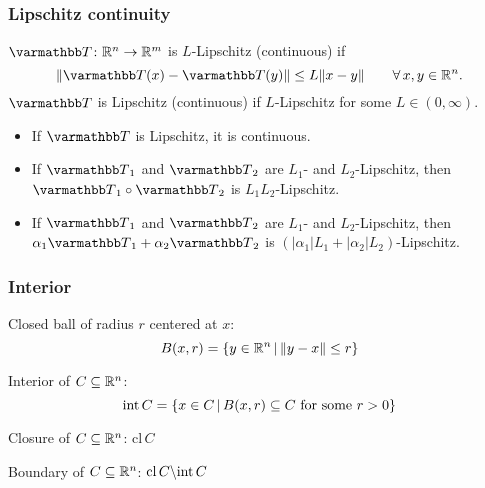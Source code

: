 \documentclass[10pt,mathserif]{beamer}
\begin{document}
\begin{frame}
\frametitle{Lipschitz continuity}
 $\opT\colon \reals^n\rightarrow\reals^m$ is $L$-Lipschitz (continuous) if
\[
\|\opT (x)-\opT (y)\|\le L\|x-y\|\qquad\forall\,x,y\in \reals^n.
\]
$\opT $ is Lipschitz (continuous) if $L$-Lipschitz for some $L\in (0,\infty)$.


\vspace{0.2in}

\begin{itemize}
\item
If $\opT$ is Lipschitz,  it is continuous.
\item
If $\opT _1$ and $\opT _2$ are $L_1$- and $L_2$-Lipschitz, then
$\opT _1\circ \opT _2$ is $L_1L_2$-Lipschitz.
\item
If $\opT _1$ and $\opT _2$ are  $L_1$- and $L_2$-Lipschitz, then
$\alpha_1\opT _1+\alpha_2 \opT _2$ is $(|\alpha_1|L_1+|\alpha_2|L_2)$-Lipschitz.
\end{itemize}
\end{frame}


\begin{frame}
\frametitle{Interior}
Closed ball of radius $r$ centered at $x$:
\[
B(x,r)=\{y\in \mathbb{R}^n\,|\,\|y-x\|\le r\}
\]

\vspace{0.2in}

Interior of $C\subseteq\mathbb{R}^n$:
\[
\mathrm{int}\, C = \{x\in C\,|\,
B(x,r)\subseteq C\text{ for some } r>0
\}
\]


\vspace{0.1in}

Closure of $C\subseteq\mathbb{R}^n$: $\mathrm{cl}\, C$

\vspace{0.2in}
Boundary of $C\subseteq\mathbb{R}^n$:  $\mathrm{cl}\, C\backslash \mathrm{int}\, C$
\end{frame}
\end{document}
